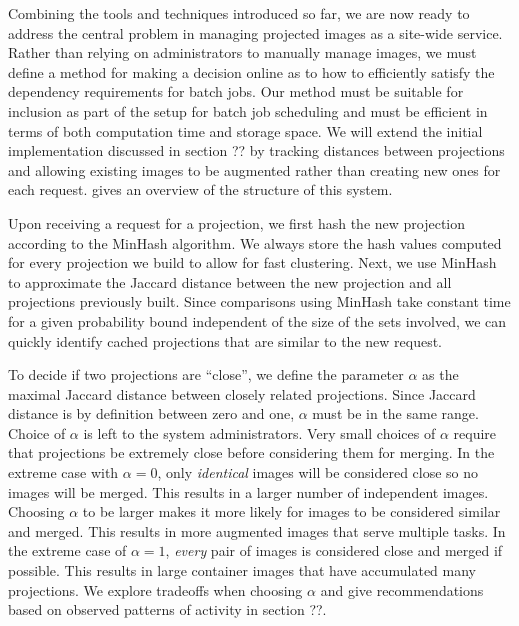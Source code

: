 \documentclass[conference]{IEEEtran}
\begin{document}
Combining the tools and techniques introduced so far,
we are now ready to address the central problem in managing projected images as a site-wide service.
Rather than relying on administrators to manually manage images,
we must define a method for making a decision online as to how to efficiently satisfy the dependency requirements for batch jobs.
Our method must be suitable for inclusion as part of the setup for batch job scheduling and must be efficient in terms of both computation time and storage space.
We will extend the initial implementation discussed in section ?? by tracking distances between projections and allowing existing images to be augmented rather than creating new ones for each request.
 gives an overview of the structure of this system.

Upon receiving a request for a projection,
we first hash the new projection according to the MinHash algorithm.
We always store the hash values computed for every projection we build to allow for fast clustering.
Next, we use MinHash to approximate the Jaccard distance between the new projection and all projections previously built.
Since comparisons using MinHash take constant time for a given probability bound independent of the size of the sets involved,
we can quickly identify cached projections that are similar to the new request.

To decide if two projections are ``close'',
we define the parameter $\alpha$ as the maximal Jaccard distance between closely related projections.
Since Jaccard distance is by definition between zero and one,
$\alpha$ must be in the same range.
Choice of $\alpha$ is left to the system administrators.
Very small choices of $\alpha$ require that projections be extremely close before considering them for merging.
In the extreme case with $\alpha = 0$,
only \emph{identical} images will be considered close so no images will be merged.
This results in a larger number of independent images.
Choosing $\alpha$ to be larger makes it more likely for images to be considered similar and merged.
This results in more augmented images that serve multiple tasks.
In the extreme case of $\alpha = 1$,
\emph{every} pair of images is considered close and merged if possible.
This results in large container images that have accumulated many projections.
We explore tradeoffs when choosing $\alpha$ and give recommendations based on observed patterns of activity in section ??.
\end{document}
